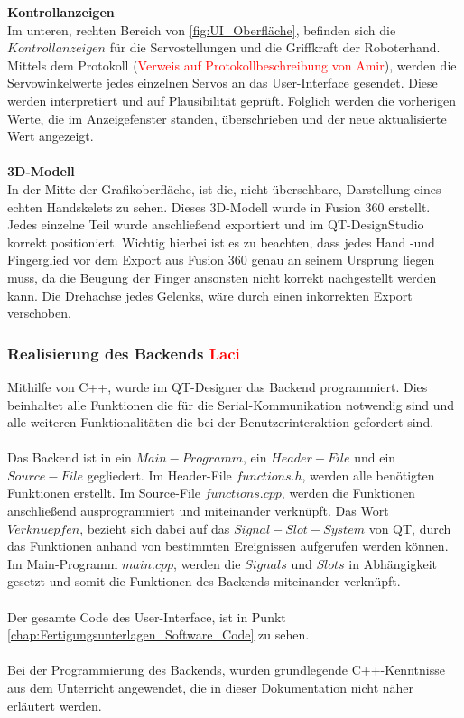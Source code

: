 \documentclass[titlepage,12pt,twoside]{article}
\begin{document}
\textbf{Kontrollanzeigen} \\ 
Im unteren, rechten Bereich von \autoref{fig:UI_Oberfläche}, befinden sich die $Kontrollanzeigen$ für die Servostellungen und die Griffkraft der Roboterhand. Mittels dem Protokoll (\textcolor{red}{Verweis auf Protokollbeschreibung von Amir}), werden
die Servowinkelwerte jedes einzelnen Servos an das User-Interface gesendet. Diese werden interpretiert und auf Plausibilität geprüft. Folglich werden die vorherigen Werte, die im Anzeigefenster standen, überschrieben und der neue aktualisierte Wert angezeigt. \\
\\
\textbf{3D-Modell} \\
In der Mitte der Grafikoberfläche, ist die, nicht übersehbare, Darstellung eines echten Handskelets zu sehen. Dieses 3D-Modell wurde in Fusion 360 erstellt. Jedes einzelne Teil wurde anschließend exportiert und im QT-DesignStudio korrekt positioniert. Wichtig
hierbei ist es zu beachten, dass jedes Hand -und Fingerglied vor dem Export aus Fusion 360 genau an seinem Ursprung liegen muss, da die Beugung der Finger ansonsten nicht korrekt nachgestellt werden kann. Die Drehachse jedes Gelenks, wäre durch einen inkorrekten Export
verschoben.  

\subsubsection{Realisierung des Backends \textcolor{red}{Laci}}
Mithilfe von C++, wurde im QT-Designer das Backend programmiert. Dies beinhaltet alle Funktionen die für die Serial-Kommunikation notwendig sind und alle weiteren Funktionalitäten die bei der Benutzerinteraktion gefordert sind. \\
\\
Das Backend ist in ein $Main-Programm$, ein $Header-File$ und ein $Source-File$ gegliedert. Im Header-File $functions.h$, werden alle benötigten Funktionen erstellt. Im Source-File $functions.cpp$, werden die Funktionen anschließend 
ausprogrammiert und miteinander verknüpft. Das Wort $Verknuepfen$, bezieht sich dabei auf das $Signal-Slot-System$ von QT, durch das Funktionen anhand von bestimmten Ereignissen aufgerufen werden können. Im Main-Programm $main.cpp$, werden die $Signals$
und $Slots$ in Abhängigkeit gesetzt und somit die Funktionen des Backends miteinander verknüpft. \\
\\
Der gesamte Code des User-Interface, ist in Punkt \autoref{chap:Fertigungsunterlagen_Software_Code} zu sehen. \\
\\
Bei der Programmierung des Backends, wurden grundlegende C++-Kenntnisse aus dem Unterricht angewendet, die in dieser Dokumentation nicht näher erläutert werden. \\
\\
\end{document}
